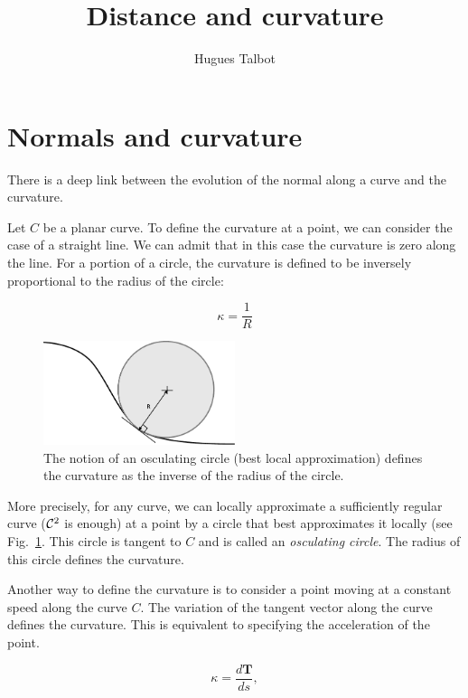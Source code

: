 \documentclass[11pt,a4paper]{article}
\title{Distance and curvature}
\author{Hugues Talbot}
\begin{document}
\maketitle
	
	
	\section{Normals and curvature}
	
	There is a deep link between the evolution of the normal along a curve and the curvature.
	
	Let $C$ be a planar curve. To define the curvature at a point, we can consider
	the case of a straight line. We can admit that in this case the curvature is zero along the line. For a portion of a circle, the curvature is defined to be inversely proportional to the radius of the circle:
	
	\begin{equation}
	\kappa = \frac{1}{R}
	\end{equation}
	
		\begin{figure}
			\centering
			\includegraphics[width=0.5\textwidth]{Drawings/Osculating.pdf}
			\caption{The notion of an osculating circle (best local approximation) defines the curvature as the inverse of the radius of the circle.\label{fig:oscul}}
		\end{figure}
	
	More precisely, for any curve, we can locally approximate a sufficiently regular curve (${\cal C}^2$ is enough) at a point by a circle that best approximates it locally (see Fig.~\ref{fig:oscul}. This circle is tangent to $C$ and is called an {\em osculating circle}. The radius of this circle defines the curvature.
	

	
	Another way to define the curvature is to consider a point moving at a constant speed along the curve $C$. The variation of the tangent vector along the curve defines the curvature. This is equivalent to specifying the acceleration of the point.
	
	
	\begin{equation}
	\kappa = \frac{d \mathbf{T}}{ds},
	\end{equation}
	
\end{document}
